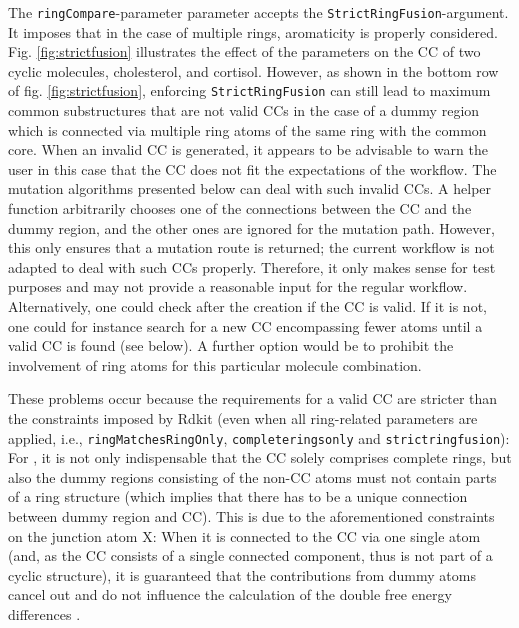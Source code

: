 The \texttt{ringCompare}-parameter parameter accepts the \texttt{StrictRingFusion}-argument.
It imposes that in the case of multiple rings, aromaticity is properly
considered. Fig. \ref{fig:strictfusion} illustrates the effect of the parameters
on the CC of two cyclic molecules, cholesterol, and cortisol. However, as shown in the bottom row of fig. \ref{fig:strictfusion}, enforcing
\texttt{StrictRingFusion} can still lead to maximum common substructures
that are not valid {\trafo} CCs in the case of a dummy region
which is connected via multiple ring atoms of the same ring with the common
core. 
When an invalid CC is generated, it appears to be advisable to warn the user in this case that the CC does not fit the expectations of the {\trafo} workflow. 
The mutation algorithms presented below can deal with such invalid CCs. A helper function arbitrarily chooses one of the connections between the CC and the dummy region, and the other ones are ignored for the mutation path. However, this only ensures that a mutation route is returned; the current {\trafo} workflow is not adapted to deal with such CCs properly. Therefore, it only makes sense for test purposes and may not provide a reasonable input for the regular workflow.
Alternatively, one could check after the creation if the CC is valid. If
it is not, one could for instance search for a new CC encompassing fewer
atoms until a valid CC is found (see below). A further option would be to prohibit the involvement of ring atoms for this particular molecule combination.

These problems occur because the requirements for a valid {\trafo} CC are stricter than the constraints imposed by Rdkit  (even when all ring-related parameters are applied, i.e., \texttt{ringMatchesRingOnly}, \texttt{completeringsonly} and \texttt{strictringfusion}): For {\trafo}, it is not only indispensable that the CC solely comprises complete rings, but also the dummy regions consisting of the non-CC atoms must not contain parts of a ring structure (which implies that there has to be a unique connection between dummy region and CC). This is due to the aforementioned constraints on the junction atom X: When it is connected to the CC via one single atom (and, as the CC consists of a single connected component, thus is not part of a cyclic structure), it is guaranteed that the contributions from dummy atoms cancel out and do not influence the calculation of the double free energy differences \cite{Karwounopoulos.2022}.

